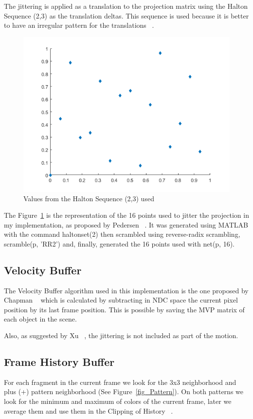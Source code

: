\documentclass{acmsiggraph}               %
\begin{document}
The jittering is applied as a translation to the projection matrix using the Halton Sequence (2,3) as the translation deltas. This sequence is used because it is better to have an irregular pattern for the translations ~\cite{Fuglsand2016,XU2016}. 
\begin{figure}[H]
    \centering
    \includegraphics[scale=0.3]{Halton.png}
    \caption{Values from the Halton Sequence (2,3) used}
    \label{fig_Halton}
\end{figure}
The Figure~\ref{fig_Halton} is the representation of the 16 points used to jitter the projection in my implementation, as proposed by Pedersen ~\cite{Fuglsand2016}. It was generated using MATLAB with the command haltonset(2) then scrambled using reverse-radix scrambling, scramble(p, 'RR2') and, finally, generated the 16 points used with net(p, 16).

\subsection{Velocity Buffer}
The Velocity Buffer algorithm used in this implementation is the one proposed by Chapman ~\cite{Chapman2012} which is calculated by subtracting in NDC space the current pixel position by its last frame position. This is possible by saving the MVP matrix of each object in the scene.

Also, as suggested by Xu ~\cite{XU2016}, the jittering is not included as part of the motion.

\subsection{Frame History Buffer}
For each fragment in the current frame we look for the 3x3 neighborhood and plus (+) pattern neighborhood (See Figure~\ref{fig_Pattern}). On both patterns we look for the minimum and maximum of colors of the current frame, later we average them and use them in the Clipping of History ~\cite{Fuglsand2016}.
\end{document}
